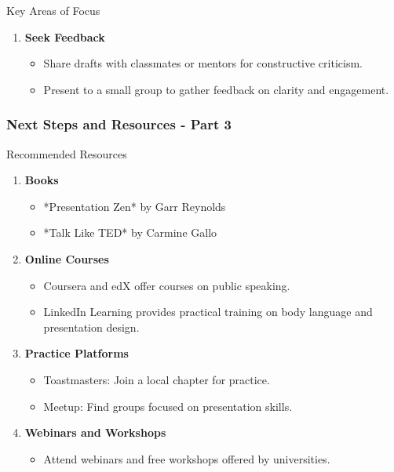 \documentclass[aspectratio=169]{beamer}
\begin{document}
\begin{frame}[fragile]
\begin{block}{Key Areas of Focus}
\begin{enumerate}
\begin{itemize}
                \end{itemize}
            \item \textbf{Seek Feedback}
                \begin{itemize}
                    \item Share drafts with classmates or mentors for constructive criticism.
                    \item Present to a small group to gather feedback on clarity and engagement.
                \end{itemize}
        \end{enumerate}
    \end{block}
\end{frame}

\begin{frame}[fragile]
    \frametitle{Next Steps and Resources - Part 3}
    \begin{block}{Recommended Resources}
        \begin{enumerate}
            \item \textbf{Books}
                \begin{itemize}
                    \item *Presentation Zen* by Garr Reynolds
                    \item *Talk Like TED* by Carmine Gallo
                \end{itemize}
            \item \textbf{Online Courses}
                \begin{itemize}
                    \item Coursera and edX offer courses on public speaking.
                    \item LinkedIn Learning provides practical training on body language and presentation design.
                \end{itemize}
            \item \textbf{Practice Platforms}
                \begin{itemize}
                    \item Toastmasters: Join a local chapter for practice.
                    \item Meetup: Find groups focused on presentation skills.
                \end{itemize}
            \item \textbf{Webinars and Workshops}
                \begin{itemize}
                    \item Attend webinars and free workshops offered by universities.
                \end{itemize}
        \end{enumerate}
    \end{block}


\end{frame}
\end{document}
